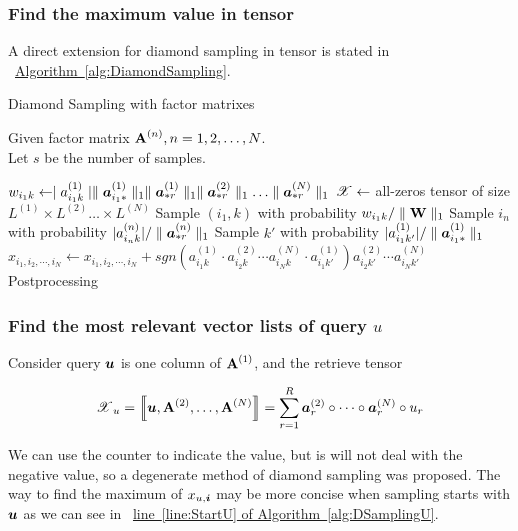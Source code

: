 \documentclass{article}
\newcommand{\Sca}[3]{{#1}^{(#2)}_{i_#2#3}}%
\newcommand{\T}[1]{\boldsymbol{\mathscr{\MakeUppercase{#1}}}}%
\newcommand{\V}[1]{{\bm{{\MakeLowercase{#1}}}}}%
\newcommand{\VnC}[3]{\V{#1}^{(#2)}_{#3}}%
\newcommand{\Varow}[1]{\V{a}^{(#1)}_{i_#1*}}
\newcommand{\Vacol}[1]{\V{a}^{(#1)}_{*r}}
\newcommand{\M}[1]{{\bm{\mathbf{\MakeUppercase{#1}}}}}%
\newcommand{\Mn}[2]{\M{#1}^{(#2)}}%
\newcommand{\norm}[2]{\parallel#1\parallel_{#2}}
\newcommand{\Alg}[1]{\hyperref[alg:#1]{Algorithm~\ref*{alg:#1}}}
\newcommand{\AlgLine}[2]{\hyperref[alg:#1]{line~\ref*{line:#2} of Algorithm~\ref*{alg:#1}}}
\newcommand{\KT}[1]{\left\llbracket #1 \right\rrbracket}
\begin{document}
\subsubsection{Find the maximum value in tensor }
A direct extension for diamond sampling in tensor is stated in ~\Alg{DiamondSampling}.
\begin{algorithm}[t]
    \caption{Diamond Sampling with factor matrixes}
    \label{alg:DiamondSampling}
    Given factor matrix $\M{A}^{(n)}, n = 1,2,\ldots,N$.\\
    Let $s$ be the number of samples.
    \begin{algorithmic}[1]
    \For{all $\Sca{a}{1}{k} \neq 0$}
    \State $w_{i_1k} \leftarrow \mid \Sca{a}{1}{k}\mid
    \norm{\Varow{1}}{1}\norm{\Vacol{1}}{1}\norm{\Vacol{2}}{1}\ldots\norm{\Vacol{N}}{1} $
    \EndFor
    \State $\T{X} \leftarrow$ all-zeros tensor of size
    $L^{(1)}\times L^{(2)}\ldots\times L^{(N)}$
    \State Sample $(i_1,k)$ with probability $w_{i_1k}/\norm{\M{W}}{1}$
    \label{line:ik}
    \State Sample $i_n$ with probability $|\Sca{a}{n}{k}|/\norm{\Vacol{n}}{1}$
    \label{line:in}
    \EndFor
    \State Sample $k'$ with probability $|\Sca{a}{1}{k'}|/\norm{\Varow{1}}{1}$
    \label{line:kp}
    \State $x_{i_1,i_2,\cdots,i_N}\leftarrow x_{i_1,i_2,\cdots,i_N} +
    sgn(\Sca{a}{1}{k}\cdot\Sca{a}{2}{k}\cdots\Sca{a}{N}{k}\cdot\Sca{a}{1}{k'})
    \Sca{a}{2}{k'}\cdots\Sca{a}{N}{k'}$
    \EndFor\\
    Postprocessing
    \end{algorithmic}
\end{algorithm}
\subsubsection{Find the most relevant vector lists of query $u$}

Consider query $\V{u}$ is one column of $\M{a}^{(1)}$, and the retrieve tensor

\[
\T{X}_u= \KT{\V{U},\Mn{A}{2},\dots,\Mn{A}{N}} =
\sum_{r=1}^{R}\VnC{A}{2}{r} \circ \cdots \circ \VnC{A}{N}{r}\circ u_r
\]

We can use the counter to indicate the value, but is will not deal with the negative value, so a degenerate method of diamond sampling was proposed.
The way to find the maximum of $x_{u,\V{i}}$ may be more concise when sampling starts with $\V{U}$ as we can see in ~\AlgLine{DSamplingU}{StartU}.
\end{document}
